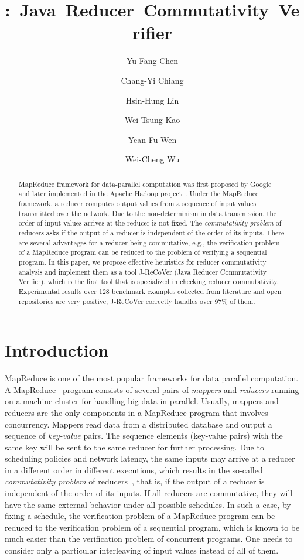 \documentclass{llncs}
\title{\hspace{-0.1cm}{J-ReCoVer}:~Java~Reducer~Commutativity~Verifier}
\author{
Yu-Fang Chen\inst{1}\inst{2}
\and
Chang-Yi Chiang\inst{2}
\and
Hsin-Hung Lin\inst{1}
\and
Wei-Tsung Kao\inst{1}
\and
Yean-Fu Wen\inst{2}
\and
Wei-Cheng Wu\inst{1}
}
\institute
{
Institute of Information Science, Academia Sinica, Taiwan
\and
Graduate Institute of Information Management, National Taipei University, Taiwan
}}
\author{}
\institute{}
\begin{document}
\maketitle

\begin{abstract}

MapReduce framework for data-parallel computation was first proposed by Google~\cite{dean04} and later implemented in the Apache Hadoop project~\cite{hadoop}.
Under the MapReduce framework, a reducer computes output values from a sequence of input values transmitted over the network.  Due to the non-determinism in data transmission, the order of input values arrives at the reducer is not fixed.
The \emph{commutativity problem} of reducers asks if the output of a reducer is independent of the order of its inputs. There are several advantages for a reducer being commutative, e.g., the verification problem of a MapReduce program can be reduced to the problem of verifying a sequential program.
In this paper, we propose effective heuristics for reducer commutativity analysis and implement them as a tool J-ReCoVer (Java Reducer Commutativity Verifier), which is the first tool that is specialized in checking reducer commutativity. Experimental results over 128 benchmark examples collected from literature and open repositories are very positive; J-ReCoVer correctly handles over 97\% of them.

\end{abstract}

\section{Introduction}
\label{section:introduction}

MapReduce is one of the most popular frameworks for data parallel computation.
A MapReduce~\cite{dean04,hadoop} program consists of several pairs of \emph{mappers} and \emph{reducers} running on a machine cluster for handling big data in parallel. Usually, mappers and reducers are the only components in a MapReduce program that involves concurrency. Mappers read data from a distributed database and output a sequence of \emph{key-value} pairs. The sequence elements (key-value pairs) with the same key will be sent to the same reducer for further processing. Due to scheduling policies and network latency, the same inputs may arrive at a reducer in a different order in different executions, which results in the so-called \emph{commutativity problem} of reducers~\cite{csallner13testing,xiao14mr,ChenHSW15,ChenSW16}, that is, if the output of a reducer is independent of the order of its inputs.
If all reducers are commutative, they will have the same external behavior under all possible schedules. In such a case, by fixing a schedule, the verification problem of a MapReduce program can be reduced to the verification problem of a sequential program, which is known to be much easier than the verification problem of concurrent programs. One needs to consider only a particular interleaving of input values instead of all of them.
\end{document}
